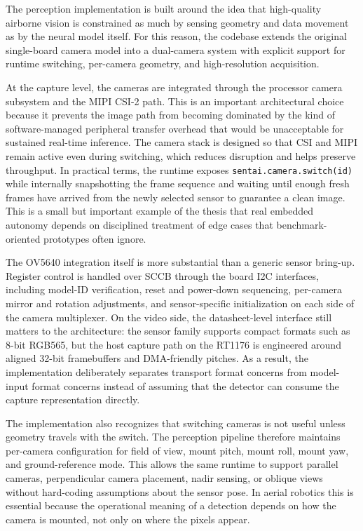 The perception implementation is built around the idea that high-quality
airborne vision is constrained as much by sensing geometry and data
movement as by the neural model itself. For this reason, the codebase
extends the original single-board camera model into a dual-camera system
with explicit support for runtime switching, per-camera geometry, and
high-resolution acquisition.

At the capture level, the cameras are integrated through the processor
camera subsystem and the MIPI CSI-2 path. This is an important
architectural choice because it prevents the image path from becoming
dominated by the kind of software-managed peripheral transfer overhead
that would be unacceptable for sustained real-time inference. The camera
stack is designed so that CSI and MIPI remain active even during
switching, which reduces disruption and helps preserve throughput. In
practical terms, the runtime exposes \texttt{sentai.camera.switch(id)}
while internally snapshotting the frame sequence and waiting until
enough fresh frames have arrived from the newly selected sensor to
guarantee a clean image. This is a small but important example of the
thesis that real embedded autonomy depends on disciplined treatment of
edge cases that benchmark-oriented prototypes often ignore.

The OV5640 integration itself is more substantial than a generic sensor
bring-up. Register control is handled over SCCB through the board I2C
interfaces, including model-ID verification, reset and power-down
sequencing, per-camera mirror and rotation adjustments, and
sensor-specific initialization on each side of the camera multiplexer.
On the video side, the datasheet-level interface still matters to the
architecture: the sensor family supports compact formats such as 8-bit
RGB565, but the host capture path on the RT1176 is engineered around
aligned 32-bit framebuffers and DMA-friendly pitches. As a result, the
implementation deliberately separates transport format concerns from
model-input format concerns instead of assuming that the detector can
consume the capture representation directly.

The implementation also recognizes that switching cameras is not useful
unless geometry travels with the switch. The perception pipeline
therefore maintains per-camera configuration for field of view, mount
pitch, mount roll, mount yaw, and ground-reference mode. This allows the
same runtime to support parallel cameras, perpendicular camera
placement, nadir sensing, or oblique views without hard-coding
assumptions about the sensor pose. In aerial robotics this is essential
because the operational meaning of a detection depends on how the camera
is mounted, not only on where the pixels appear.

